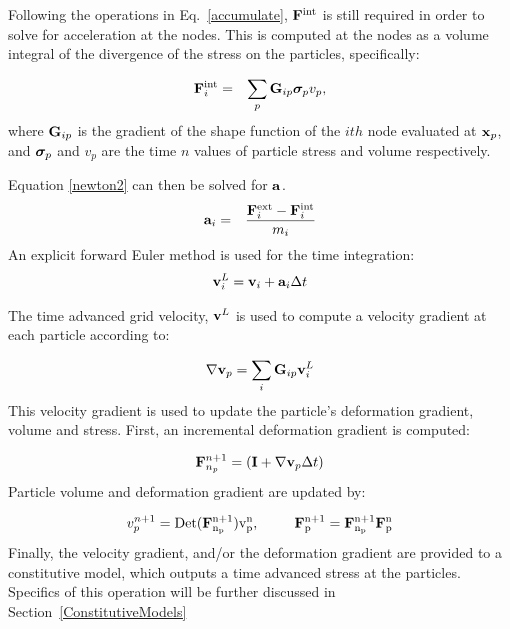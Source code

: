 Following the operations in Eq.~\ref{accumulate}, ${\bf F}^{\rm{int}}$
is still required in order to solve for acceleration at the nodes.
This is computed at the nodes as a volume integral of the divergence
of the stress on the particles, specifically:

\begin{eqnarray}
{\bf F}^{\rm{int}}_i &=& \sum_{p} {\bf G}_{ip} \mbox{\boldmath $\sigma \!\!$ \unboldmath}_p v_p,
\label{computeIntForce}  
\end{eqnarray}
where ${\bf G}_{ip}$ is the gradient of the shape function of the $ith$ node
evaluated at ${\bf x}_p$, and $\mbox{\boldmath $\sigma \!\!$ \unboldmath}_p$ and $v_p$ are the time $n$ values of
particle stress and volume respectively.  

Equation \ref{newton2} can then be solved for ${\bf a}$.
\begin{eqnarray}
{\bf a}_i &=& \frac{{\bf F}_i^{\rm{ext}} - {\bf F}_i^{\rm{int}}}{m_i}
\label{MPM:acceleration}
\end{eqnarray}
An explicit forward Euler method is used for the time integration:
\begin{eqnarray}
{\bf v}_i^L= {\bf v}_i + {\bf a}_i \Delta{t}
\label{MPM:euler}
\end{eqnarray}

The time advanced grid velocity, ${\bf v}^L$ is used to compute a velocity
gradient at each particle according to:

\begin{equation}
\nabla {\bf v}_p = \sum_i {\bf G}_{ip} {\bf v}^L_i
\label{velgrad}
\end{equation}
This velocity gradient is used to update the particle's deformation gradient,
volume and stress.  First, an incremental deformation gradient is computed:

\begin{equation}
{\bf F}_{n_p}^{n+1} = ({\bf I}+\nabla {\bf v}_p \Delta{t})
\label{Finc}
\end{equation}
Particle volume and deformation gradient are updated by:

\begin{eqnarray}
v_p^{n+1} = \rm{Det}({\bf F}_{n_p}^{n+1})v_p^n,  \;\;\;\;\;\;\;\;\;
{\bf F}_p^{n+1}={\bf F}_{n_p}^{n+1} {\bf F}_{p}^{n}
\label{p_vol}
\end{eqnarray}
Finally, the velocity gradient, and/or the deformation gradient are
provided to a constitutive model, which outputs a time advanced stress
at the particles.  Specifics of this operation will be further discussed
in Section~\ref{ConstitutiveModels}

